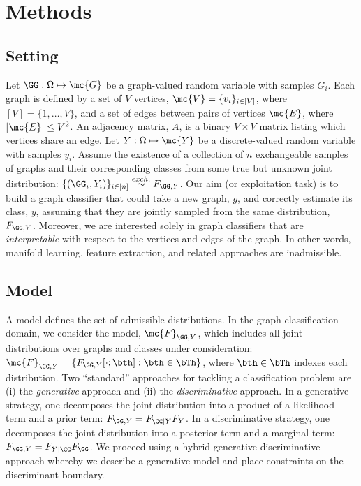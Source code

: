 \documentclass[10pt,journal,cspaper,compsoc]{IEEEtran}
\begin{document}
\section{Methods} %
\label{sec:methods}


\subsection{Setting}

Let $\GG: \Omega \mapsto \mc{G}$ be a graph-valued random variable with samples $G_i$.  Each graph is defined by a set of $V$ vertices, $\mc{V}=\{v_i\}_{i \in [V]}$, where $[V]=\{1,\ldots, V\}$, and a set of edges between pairs of vertices $\mc{E}$, where $|\mc{E}| \leq V^2$. An adjacency matrix, $A$, is a binary $V \times V$ matrix listing  which vertices share an edge. Let $Y:\Omega \mapsto \mc{Y}$ be a discrete-valued random variable with samples $y_i$.  Assume the existence of a collection of $n$ exchangeable samples of graphs and their corresponding classes from some true but unknown joint distribution: $\{(\GG_i,Y_i)\}_{i \in [n]} \overset{exch.}{\sim} F_{\GG,Y}$. Our aim (or exploitation task) is to build a graph classifier that could take a new graph, $g$, and correctly estimate its class, $y$, assuming that they are jointly sampled from the same distribution, $F_{\GG,Y}$.  Moreover, we are interested solely in graph classifiers that are \emph{interpretable} with respect to the vertices and edges of the graph. In other words, manifold learning, feature extraction, and related approaches are inadmissible.  

\subsection{Model} %
\label{sub:model}

A model defines the set of admissible distributions.  In the graph classification domain, we consider the model, $\mc{F}_{\GG,Y}$, which includes all joint distributions over graphs and classes under consideration: $\mc{F}_{\GG,Y}=\{F_{\GG, Y}[\cdot; \bth] : \bth \in \bTh\}$, where $\bth \in \bTh$ indexes each distribution.  Two ``standard'' approaches for tackling a classification problem are (i) the \emph{generative} approach and (ii) the \emph{discriminative} approach.  In a generative strategy, one decomposes the joint distribution into a product of a likelihood term and a prior term:  $F_{\GG,Y}=F_{\GG | Y}F_Y$.  In a discriminative strategy, one decomposes the joint distribution into a posterior term and a marginal term: $F_{\GG,Y}=F_{Y | \GG}F_{\GG}$.  We proceed using a hybrid generative-discriminative approach whereby we describe a generative model and place constraints on the discriminant boundary.
\end{document}
